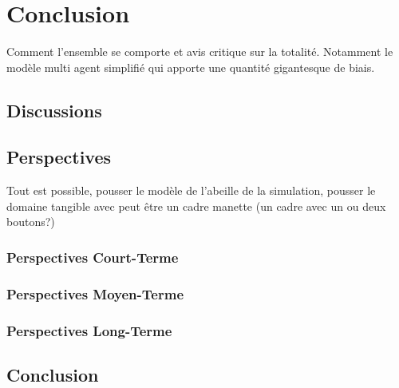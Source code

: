 \chapter*{Conclusion}

	Comment l'ensemble se comporte et avis critique sur la totalité. Notamment le modèle multi agent simplifié qui apporte une quantité gigantesque de biais.
\section*{Discussions}
	
\section*{Perspectives}
	Tout est possible, pousser le modèle de l'abeille de la simulation, pousser le domaine tangible avec peut être un cadre manette (un cadre avec un ou deux boutons?)
	\subsection{Perspectives Court-Terme}	
	\subsection{Perspectives Moyen-Terme}	
	\subsection{Perspectives Long-Terme}		
	
\section*{Conclusion}
	
